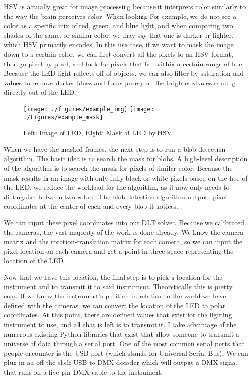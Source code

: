 \documentclass[
    12pt,
    twoside,
    bibstyle=chicago,
    headerstyle=uppercase,
	bibfile=biblatex_updating.bib
]{reedthesis}
\begin{document}
HSV is actually great for image processing because it interprets color similarly to the way the brain perceives color. When looking For example, we do not see a color as a specific mix of red, green, and blue light, and when comparing two shades of the same, or similar color, we may say that one is darker or lighter, which HSV primarily encodes. In this use case, if we want to mask the image down to a certain color, we can first convert all the pixels to an HSV format, then go pixel-by-pixel, and look for pixels that fall within a certain range of hue. Because the LED light reflects off of objects, we can also filter by saturation and values to remove darker blues and focus purely on the brighter shades coming directly out of the LED.

\begin{figure}[h]
	   
	       \centering
	    
	    \texttt{[image: ./figures/example\_img]} 
		\hfill	    
	    \texttt{[image: ./figures/example\_mask]}
	     \caption{Left: Image of LED, Right: Mask of LED by HSV}
	 \label{LED Masking Example}
	\end{figure}

When we have the masked frames, the next step is to run a blob detection algorithm. The basic idea is to search the mask for blobs. A high-level description of the algorithm is to search the mask for pixels of similar color. Because the mask results in an image with only fully black or white pixels based on the hue of the LED, we reduce the workload for the algorithm, as it now only needs to distinguish between two colors. The blob detection algorithm outputs pixel coordinates at the center of each and every blob it notices.

We can input these pixel coordinates into our DLT solver. Because we calibrated the cameras, the vast majority of the work is done already. We know the camera matrix and the rotation-translation matrix for each camera, so we can input the pixel location on each camera and get a point in three-space representing the location of the LED.
	
Now that we have this location, the final step is to pick a location for the instrument and to transmit it to said instrument. Theoretically this is pretty easy. If we know the instrument's position in relation to the world we have defined with the cameras, we can convert the location of the LED to polar coordinates. At this point, there are defined values that exist for the lighting instrument to use, and all that is left is to transmit it. I take advantage of the numerous existing Python libraries that exist that allow someone to transmit a universe of data through a serial port. One of the most common serial ports that people encounter is the USB port (which stands for Universal Serial Bus). We can plug in an off-the-shelf USB to DMX decoder which will output a DMX signal that runs on a five-pin DMX cable to the instrument.
\end{document}
